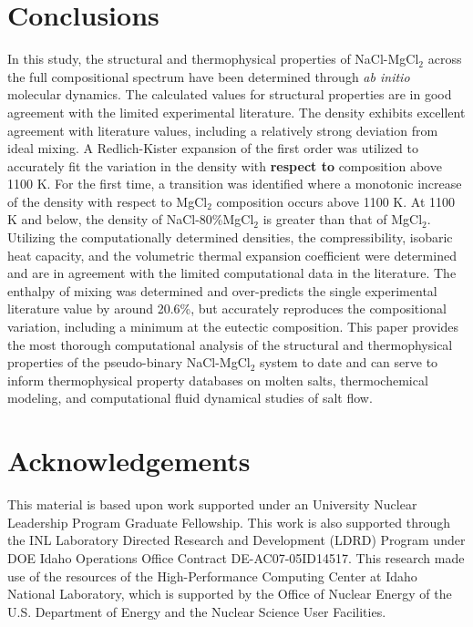\documentclass[review]{elsarticle}
\providecommand{\DIFaddtex}[1]{{\bf #1}} %
\providecommand{\DIFaddbegin}{\protect\color{blue}} %
\providecommand{\DIFaddend}{\protect\color{black}} %
\providecommand{\DIFadd}[1]{\texorpdfstring{\DIFaddtex{#1}}{#1}} %
\newcommand{\DIFaddincludegraphics}[2][]{{\color{blue}\fbox{\DIFOincludegraphics[#1]{#2}}}} %
\DeclareRobustCommand{\DIFaddbegin}{\DIFOaddbegin \let\includegraphics\DIFaddincludegraphics} %
\DeclareRobustCommand{\DIFaddend}{\DIFOaddend \let\includegraphics\DIFOincludegraphics} %
\begin{document}
\section{Conclusions}
In this study, the structural and thermophysical properties of NaCl-MgCl$_2$ across the full compositional spectrum have been determined through \textit{ab initio} molecular dynamics. The calculated values for structural properties are in good agreement with the limited experimental literature. The density exhibits excellent agreement with literature values, including a relatively strong deviation from ideal mixing. A Redlich-Kister expansion of the first order was utilized to accurately fit the variation in the density with \DIFaddbegin \DIFadd{respect to }\DIFaddend composition above 1100 K. For the first time, a transition was identified where a monotonic increase of the density with respect to MgCl$_2$ composition occurs above 1100 K. At 1100 K and below, the density of NaCl-80\%MgCl$_2$ is greater than that of MgCl$_2$. Utilizing the computationally determined densities, the compressibility, isobaric heat capacity, and the volumetric thermal expansion coefficient were determined and are in agreement with the limited computational data in the literature. The enthalpy of mixing was determined and over-predicts the single experimental literature value by around 20.6\%, but accurately reproduces the compositional variation, including a minimum at the eutectic composition. This paper provides the most thorough computational analysis of the structural and thermophysical properties of the pseudo-binary NaCl-MgCl$_2$ system to date and can serve to inform thermophysical property databases on molten salts, thermochemical modeling, and computational fluid dynamical studies of salt flow. 


\section{Acknowledgements}

This material is based upon work supported under an University Nuclear Leadership Program Graduate Fellowship. This work is also supported through the INL Laboratory Directed Research and Development (LDRD) Program under DOE Idaho Operations Office Contract DE-AC07-05ID14517. This research made use of the resources of the High-Performance Computing Center at Idaho National Laboratory, which is supported by the Office of Nuclear Energy of the U.S. Department of Energy and the Nuclear Science User Facilities.  


\end{document}
